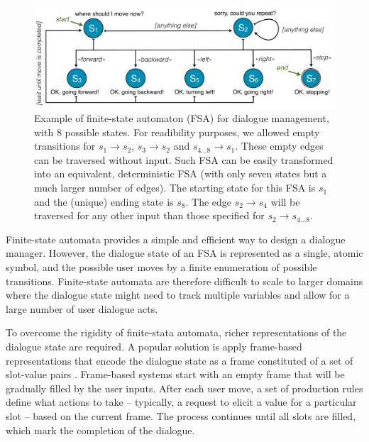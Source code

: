 \begin{figure}[h]
\centering
\includegraphics[scale=0.34]{imgs/fsa.pdf}
\caption{Example of finite-state automaton (FSA) for dialogue management, with 8 possible states.  For readibility purposes, we allowed empty transitions for $s_1 \rightarrow s_2$, $s_3 \rightarrow s_2$ and $s_{4...8} \rightarrow s_1$. These empty edges can be traversed without input.  Such FSA can be easily transformed into an equivalent, deterministic FSA (with only seven states but a much larger number of edges). The starting state for this FSA is $s_1$ and the (unique) ending state is $s_8$. The edge $s_2 \rightarrow s_4$ will be traversed for any other input than those specified for $s_2 \rightarrow s_{4...8}$.}
\label{fig:fsa}
\end{figure}

Finite-state automata provides a simple and efficient way to design a dialogue manager. However, the dialogue state of an FSA is represented as a single, atomic symbol, and the possible user moves by a finite enumeration of possible transitions.  Finite-state automata are therefore difficult to scale to larger domains where the dialogue state might need to track multiple variables and allow for a large number of user dialogue acts.  

To overcome the rigidity of finite-stata automata, richer representations of the dialogue state are required. A popular solution is apply frame-based representations that encode the dialogue state as a frame constituted of a set of slot-value pairs \citep{seneff2000} .  Frame-based systems start with an empty frame that will be gradually filled by the user inputs.  After each user move, a set of production rules define what actions to take  -- typically, a request to elicit a value for a particular slot -- based on the current frame.  The process continues until all slots are filled, which mark the completion of the dialogue. 

